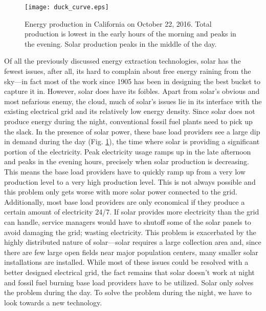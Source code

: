 \begin{figure}[ht]
    \centering
    \texttt{[image: duck\_curve.eps]}
    \caption{Energy production in California on October 22, 2016.\cite{caiso} Total production is lowest in the early hours of the morning and peaks in the evening. Solar production peaks in the middle of the day.}
    \label{fig:duck_curve}
\end{figure}
Of all the previously discussed energy extraction technologies, solar has the fewest issues, after all, its hard to complain about free energy raining from the sky---in fact most of the work since 1905 has been in designing the best bucket to capture it in. However, solar does have its foibles. Apart from solar's obvious and most nefarious enemy, the cloud, much of solar's issues lie in its interface with the existing electrical grid and its relatively low energy density. Since solar does not produce energy during the night, conventional fossil fuel plants need to pick up the slack. In the presence of solar power, these base load providers see a large dip in demand during the day (Fig. \ref{fig:duck_curve}), the time where solar is providing a significant portion of the electricity. Peak electricity usage ramps up in the late afternoon and peaks in the evening hours, precisely when solar production is decreasing. This means the base load providers have to quickly ramp up from a very low production level to a very high production level. This is not always possible and this problem only gets worse with more solar power connected to the grid. Additionally, most base load providers are only economical if they produce a certain amount of electricity 24/7. If solar provides more electricity than the grid can handle, service managers would have to shutoff some of the solar panels to avoid damaging the grid; wasting electricity. This problem is exacerbated by the highly distributed nature of solar---solar requires a large collection area and, since there are few large open fields near major population centers, many smaller solar installations are installed. While most of these issues could be resolved with a better designed electrical grid, the fact remains that solar doesn't work at night and fossil fuel burning base load providers have to be utilized. Solar only solves the problem during the day. To solve the problem during the night, we have to look towards a new technology. 

